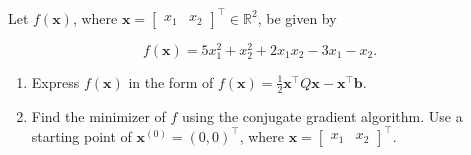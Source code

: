 \documentclass{article}
\begin{document}
\thispagestyle{empty}

\titleBC

\begin{question*}[1]
	Let \( f(\mathbf{x}) \), where \( \mathbf{x} = \begin{bmatrix} x_1 & x_2 \end{bmatrix}^\top \in \mathbb{R}^2 \), be given by

    \[
        f(\mathbf{x}) = 5x_1^2 + x_2^2 + 2x_1 x_2 - 3x_1 - x_2.
    \]

    \begin{enumerate}[label=(\alph*)]
        \item Express \( f(\mathbf{x}) \) in the form of \( f(\mathbf{x}) = \frac{1}{2} \mathbf{x}^\top Q \mathbf{x} - \mathbf{x}^\top \mathbf{b} \).
        \item Find the minimizer of \( f \) using the conjugate gradient algorithm. Use a starting point of \( \mathbf{x}^{(0)} = (0, 0)^\top\), where \( \mathbf{x} = \begin{bmatrix} x_1 & x_2 \end{bmatrix}^\top \).
    \end{enumerate}
\end{question*}
\end{document}
